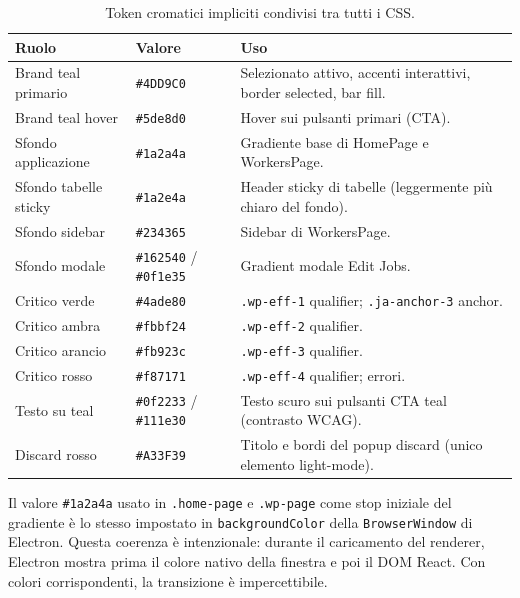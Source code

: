 \documentclass[a4paper,12pt]{article}
\begin{document}
\begin{table}[H]
\centering\small
\caption{Token cromatici impliciti condivisi tra tutti i CSS.}
\begin{tabular}{L{3.5cm} L{2.5cm} L{6.5cm}}
\toprule
\textbf{Ruolo} & \textbf{Valore} & \textbf{Uso} \\
\midrule
Brand teal primario & \texttt{\#4DD9C0} &
  Selezionato attivo, accenti interattivi, border selected, bar fill. \\[2pt]
Brand teal hover & \texttt{\#5de8d0} &
  Hover sui pulsanti primari (CTA). \\[2pt]
Sfondo applicazione & \texttt{\#1a2a4a} &
  Gradiente base di HomePage e WorkersPage. \\[2pt]
Sfondo tabelle sticky & \texttt{\#1a2e4a} &
  Header sticky di tabelle (leggermente pi\`{u} chiaro del fondo). \\[2pt]
Sfondo sidebar & \texttt{\#234365} &
  Sidebar di WorkersPage. \\[2pt]
Sfondo modale & \texttt{\#162540} / \texttt{\#0f1e35} &
  Gradient modale Edit Jobs. \\[2pt]
Critico verde & \texttt{\#4ade80} &
  \texttt{.wp-eff-1} qualifier; \texttt{.ja-anchor-3} anchor. \\[2pt]
Critico ambra & \texttt{\#fbbf24} &
  \texttt{.wp-eff-2} qualifier. \\[2pt]
Critico arancio & \texttt{\#fb923c} &
  \texttt{.wp-eff-3} qualifier. \\[2pt]
Critico rosso & \texttt{\#f87171} &
  \texttt{.wp-eff-4} qualifier; errori. \\[2pt]
Testo su teal & \texttt{\#0f2233} / \texttt{\#111e30} &
  Testo scuro sui pulsanti CTA teal (contrasto WCAG). \\[2pt]
Discard rosso & \texttt{\#A33F39} &
  Titolo e bordi del popup discard (unico elemento light-mode). \\
\bottomrule
\end{tabular}
\end{table}

\begin{infobox}
Il valore \texttt{\#1a2a4a} usato in \texttt{.home-page} e
\texttt{.wp-page} come stop iniziale del gradiente \`{e} lo stesso
impostato in \texttt{backgroundColor} della \texttt{BrowserWindow}
di Electron. Questa coerenza \`{e} intenzionale: durante il caricamento
del renderer, Electron mostra prima il colore nativo della finestra
e poi il DOM React. Con colori corrispondenti, la transizione \`{e}
impercettibile.
\end{infobox}
\end{document}

